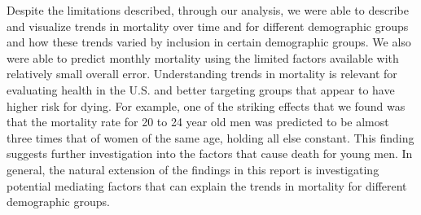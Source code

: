\documentclass[letterpaper, 11pt]{article}
\begin{document}
Despite the limitations described, through our analysis, we were able to describe and visualize trends in mortality over time and for different demographic groups and how these trends varied by inclusion in certain demographic groups. We also were able to predict monthly mortality using the limited factors available with relatively small overall error. Understanding  trends in mortality is relevant for evaluating health in the U.S. and better targeting groups that appear to have higher risk for dying. For example, one of the striking effects that we found was that the mortality rate for 20 to 24 year old men was predicted to be almost three times that of women of the same age, holding all else constant. This finding suggests further investigation into the factors that cause death for young men. In general, the natural extension of the findings in this report is investigating potential mediating factors that can explain the trends in mortality for different demographic groups.




\end{document}
